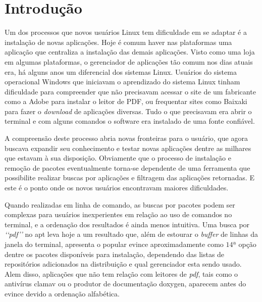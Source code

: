 \chapter{Introdução}
\label{cha:introducao}



Um dos processos  que novos usuários Linux tem dificuldade em se adaptar é a instalação de novas aplicações. Hoje é comum haver nas plataformas uma aplicação que centraliza a instalação das demais aplicações. Visto como uma loja em algumas plataformas, o gerenciador de aplicações tão comum nos dias atuais era, há alguns anos um diferencial dos sistemas Linux. Usuários do sistema operacional Windows que iniciavam o aprendizado do sistema Linux  tinham dificuldade para compreender que não precisavam acessar o site de um fabricante como a Adobe para instalar o leitor de PDF, ou frequentar sites como Baixaki para fazer o \textit{download} de aplicações diversas. Tudo o que precisavam era abrir o terminal e com alguns comandos o software era instalado de uma fonte confiável. 

A compreensão deste processo abria novas fronteiras para o  usuário, que agora buscava expandir seu conhecimento e testar novas aplicações dentre as milhares que estavam à sua disposição. Obviamente que o processo de instalação e remoção de pacotes eventualmente torna-se dependente de uma ferramenta que possibilite realizar buscas por aplicações e filtragem das aplicações retornadas. E este é o ponto onde os novos usuários encontravam maiores dificuldades. 

Quando realizadas em linha de comando, as buscas por pacotes podem ser complexas para usuários inexperientes em relação ao uso de comandos no terminal, e a ordenação dos resultados é ainda menos intuitiva. Uma busca por \textit{\lq\lq pdf\rq\rq} no {\code apt} leva hoje a um resultado que, além de estourar o \textit{buffer} de linhas da janela do terminal, apresenta o popular {\code evince} aproximadamente como $14ª$ opção dentre os  pacotes disponíveis para instalação, dependendo das listas de repositórios adicionados na distribuição e qual gerenciador esta sendo usado.
Alem disso, aplicações que não tem relação com leitores de \textit{pdf}, tais como o antivírus {\code clamav} ou o produtor de documentação {\code doxygen}, aparecem antes do {\code evince} devido a ordenação alfabética.

